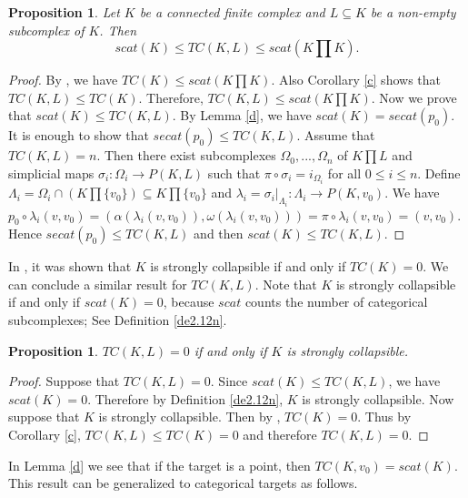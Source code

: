 \documentclass[preprint,11pt %
]{hjm1}
\newtheorem{proposition}[theorem]{Proposition}
\theoremstyle{definition}
\begin{document}
\begin{proposition}\label{ine}%
Let $K$ be a connected finite complex and $L\subseteq K$ be a non-empty subcomplex of $K$. Then 
\[
scat(K)\leq TC(K,L)\leq scat (K\prod K).
\]
\end{proposition}

\begin{proof}
By \cite[Theorem 4.4]{dis}, we have $TC(K)\leq scat (K\prod K)$. Also Corollary \ref{c} shows that $TC(K,L)\leq TC(K)$. Therefore, $TC(K,L)\leq scat (K\prod K)$. Now we prove that $scat(K)\leq TC(K,L)$. By Lemma \ref{d}, we have $scat(K)=secat(p_0)$. It is enough to show that $secat(p_0)\leq TC(K,L)$. Assume that $TC(K,L)=n$. Then there exist subcomplexes $\Omega _0,...,\Omega_n$ of $K \prod L$ and simplicial maps $\sigma _i:\Omega _i\to P(K,L)$ such that $\pi \circ \sigma _i=i_{\Omega _i}$ for all $0\leq i\leq n$. Define $\Lambda _i=\Omega _i \cap (K\prod \lbrace v_0\rbrace)\subseteq K\prod \lbrace v_0\rbrace$ and $\lambda _i=\sigma _i \vert _{\Lambda _i}:\Lambda _i\to P(K,v_0)$. We have $p_0 \circ \lambda _i(v,v_0)=(\alpha(\lambda_i(v,v_0)),\omega (\lambda_i(v,v_0)))= \pi \circ \lambda _i (v,v_0)=(v,v_0)$. Hence $secat(p_0)\leq TC(K,L)$ and then $scat (K) \le TC(K,L)$.
\end{proof}


In \cite{dis}, it was shown that $K$ is strongly collapsible if and only if $TC(K)=0$. We can conclude a similar result for $TC(K,L)$. Note that $K$ is strongly collapsible if and only if $scat (K) =0$, because $scat$ counts the number of categorical subcomplexes; See Definition \ref{de2.12n}.


\begin{proposition}%
$TC(K,L)=0$ if and only if $K$ is strongly collapsible.
\end{proposition}

\begin{proof}
Suppose that $TC(K,L)=0$. Since $ scat (K)\leq TC(K,L)$, we have $ scat (K) = 0$. Therefore by Definition \ref{de2.12n}, $K$ is strongly collapsible. Now suppose that $K$ is strongly collapsible. Then by \cite[Corollary 4.5]{dis}, $TC(K)=0$. Thus by Corollary \ref{c}, $TC(K,L)\leq TC(K)=0$ and therefore $TC(K,L)=0$.
\end{proof}



In Lemma \ref {d} we see that if the target is a point, then $TC(K, v_0) = scat (K)$. This result can be generalized to categorical targets as follows. 
\end{document}
